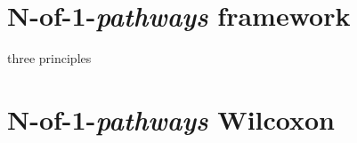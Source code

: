 %
%

\section{N-of-1-\emph{pathways} framework}\label{sec:nof1pathways}

\indent\indent three principles

\section{N-of-1-\emph{pathways} Wilcoxon}\label{sec:wilcoxon}

